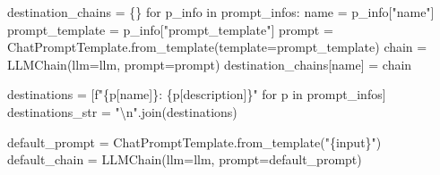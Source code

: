 \documentclass[
  letterpaper,
  DIV=11,
  numbers=noendperiod]{scrreprt}
\newenvironment{Shaded}{\begin{snugshade}}{\end{snugshade}}
\newcommand{\CharTok}[1]{\textcolor[rgb]{0.13,0.47,0.30}{#1}}
\newcommand{\ControlFlowTok}[1]{\textcolor[rgb]{0.00,0.23,0.31}{#1}}
\newcommand{\KeywordTok}[1]{\textcolor[rgb]{0.00,0.23,0.31}{#1}}
\newcommand{\NormalTok}[1]{\textcolor[rgb]{0.00,0.23,0.31}{#1}}
\newcommand{\OperatorTok}[1]{\textcolor[rgb]{0.37,0.37,0.37}{#1}}
\newcommand{\SpecialCharTok}[1]{\textcolor[rgb]{0.37,0.37,0.37}{#1}}
\newcommand{\SpecialStringTok}[1]{\textcolor[rgb]{0.13,0.47,0.30}{#1}}
\newcommand{\StringTok}[1]{\textcolor[rgb]{0.13,0.47,0.30}{#1}}
\begin{document}
\begin{Shaded}
\begin{Highlighting}[]
\NormalTok{destination\_chains }\OperatorTok{=}\NormalTok{ \{\}}
\ControlFlowTok{for}\NormalTok{ p\_info }\KeywordTok{in}\NormalTok{ prompt\_infos:}
\NormalTok{    name }\OperatorTok{=}\NormalTok{ p\_info[}\StringTok{"name"}\NormalTok{]}
\NormalTok{    prompt\_template }\OperatorTok{=}\NormalTok{ p\_info[}\StringTok{"prompt\_template"}\NormalTok{]}
\NormalTok{    prompt }\OperatorTok{=}\NormalTok{ ChatPromptTemplate.from\_template(template}\OperatorTok{=}\NormalTok{prompt\_template)}
\NormalTok{    chain }\OperatorTok{=}\NormalTok{ LLMChain(llm}\OperatorTok{=}\NormalTok{llm, prompt}\OperatorTok{=}\NormalTok{prompt)}
\NormalTok{    destination\_chains[name] }\OperatorTok{=}\NormalTok{ chain}

\NormalTok{destinations }\OperatorTok{=}\NormalTok{ [}\SpecialStringTok{f"}\SpecialCharTok{\{}\NormalTok{p[}\StringTok{\textquotesingle{}name\textquotesingle{}}\NormalTok{]}\SpecialCharTok{\}}\SpecialStringTok{: }\SpecialCharTok{\{}\NormalTok{p[}\StringTok{\textquotesingle{}description\textquotesingle{}}\NormalTok{]}\SpecialCharTok{\}}\SpecialStringTok{"} \ControlFlowTok{for}\NormalTok{ p }\KeywordTok{in}\NormalTok{ prompt\_infos]}
\NormalTok{destinations\_str }\OperatorTok{=} \StringTok{"}\CharTok{\textbackslash{}n}\StringTok{"}\NormalTok{.join(destinations)}
\end{Highlighting}
\end{Shaded}

\begin{Shaded}
\begin{Highlighting}[]
\NormalTok{default\_prompt }\OperatorTok{=}\NormalTok{ ChatPromptTemplate.from\_template(}\StringTok{"}\SpecialCharTok{\{input\}}\StringTok{"}\NormalTok{)}
\NormalTok{default\_chain }\OperatorTok{=}\NormalTok{ LLMChain(llm}\OperatorTok{=}\NormalTok{llm, prompt}\OperatorTok{=}\NormalTok{default\_prompt)}
\end{Highlighting}
\end{Shaded}
\end{document}
